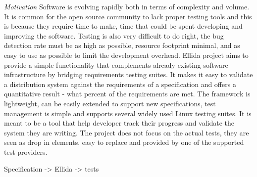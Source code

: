 \documentclass{article}
\begin{document}
	\emph{Motivation}
	Software is evolving rapidly both in terms of complexity and volume. It is common for the open source community to lack proper testing tools and this is because they require time to make, time that could be spent developing and improving the software. Testing is also very difficult to do right, the bug detection rate must be as high as possible, resource footprint minimal, and as easy to use as possible to limit the development overhead. Ellida project aims to provide a simple functionality that complements already existing software infrastructure by bridging requirements testing suites. It makes it easy to validate a distribution system against the requirements of a specification and offers a quantitative result - what percent of the requirements are met. The framework is lightweight, can be easily extended to support new specifications, test management is simple and supports several widely used Linux testing suites. It is meant to be a tool that help developer track their progress and validate the system they are writing. The project does not focus on the actual tests, they are seen as drop in elements, easy to replace and provided by one of the supported test providers.

	Specification -> Ellida -> tests
\end{document}
